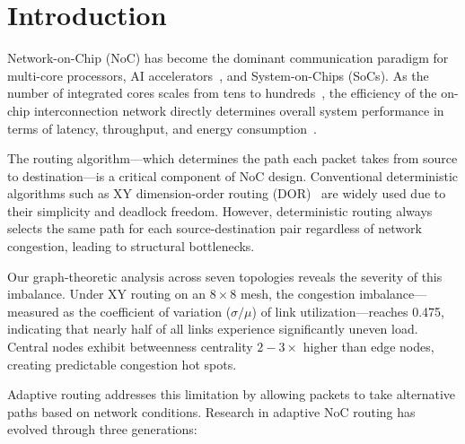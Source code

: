 \section{Introduction}
\label{sec:intro}

Network-on-Chip (NoC) has become the dominant communication paradigm for multi-core processors, AI accelerators~\cite{journeys}, and System-on-Chips (SoCs). As the number of integrated cores scales from tens to hundreds~\cite{amd2023,apple2023}, the efficiency of the on-chip interconnection network directly determines overall system performance in terms of latency, throughput, and energy consumption~\cite{dally2004}.

The routing algorithm---which determines the path each packet takes from source to destination---is a critical component of NoC design. Conventional deterministic algorithms such as XY dimension-order routing (DOR)~\cite{dally2004} are widely used due to their simplicity and deadlock freedom. However, deterministic routing always selects the same path for each source-destination pair regardless of network congestion, leading to structural bottlenecks.

Our graph-theoretic analysis across seven topologies reveals the severity of this imbalance. Under XY routing on an $8\times8$ mesh, the congestion imbalance---measured as the coefficient of variation ($\sigma/\mu$) of link utilization---reaches 0.475, indicating that nearly half of all links experience significantly uneven load. Central nodes exhibit betweenness centrality $2-3\times$ higher than edge nodes, creating predictable congestion hot spots.

Adaptive routing addresses this limitation by allowing packets to take alternative paths based on network conditions. Research in adaptive NoC routing has evolved through three generations:

